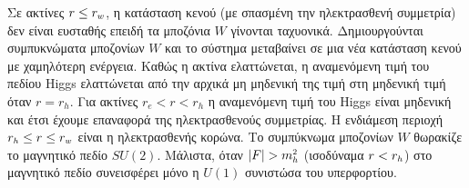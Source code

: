 Σε ακτίνες $r\le r\subscr{w}$, η κατάσταση κενού (με σπασμένη την ηλεκτρασθενή συμμετρία) δεν είναι ευσταθής επειδή τα μποζόνια $W$ γίνονται ταχυονικά. Δημιουργούνται συμπυκνώματα μποζονίων $W$ και το σύστημα μεταβαίνει σε μια νέα κατάσταση κενού με χαμηλότερη ενέργεια. Καθώς η ακτίνα ελαττώνεται, η αναμενόμενη τιμή του πεδίου Higgs ελαττώνεται από την αρχικά μη μηδενική της τιμή στη μηδενική τιμή όταν $r=r_h$. Για ακτίνες $r_e<r<r_h$ η αναμενόμενη τιμή του Higgs είναι μηδενική και έτσι έχουμε επαναφορά της ηλεκτρασθενούς συμμετρίας. 
Η ενδιάμεση περιοχή $r\subscr{h}\le r\le r\subscr{w}$ είναι η ηλεκτρασθενής κορώνα. Το συμπύκνωμα μποζονίων $W$ θωρακίζε το μαγνητικό πεδίο $SU(2)$. Μάλιστα, όταν $|F|>m\superscr{2}\subscr{h}$ (ισοδύναμα $r<r\subscr{h}$) στο μαγνητικό πεδίο συνεισφέρει μόνο η $U(1)$ συνιστώσα του υπερφορτίου. 

